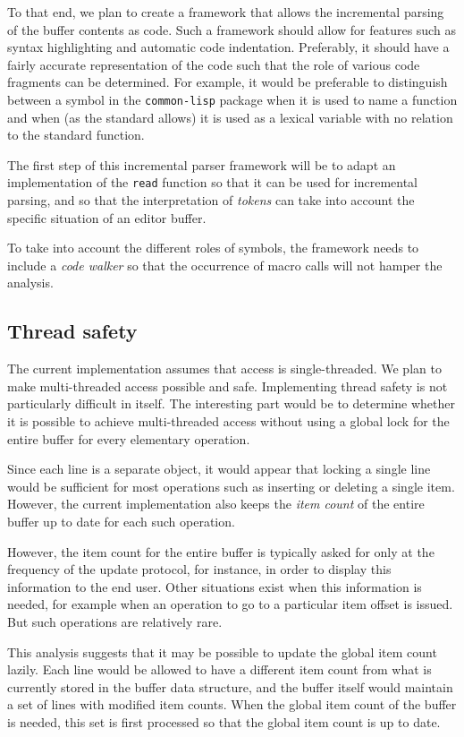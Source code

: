 To that end, we plan to create a framework that allows the incremental
parsing of the buffer contents as \commonlisp{} code.  Such a
framework should allow for features such as syntax highlighting and
automatic code indentation.  Preferably, it should have a fairly
accurate representation of the code such that the role of various code
fragments can be determined.  For example, it would be preferable to
distinguish between a symbol in the \texttt{common-lisp} package when
it is used to name a \commonlisp{} function and when (as the
\commonlisp{} standard allows) it is used as a lexical variable with
no relation to the standard function.

The first step of this incremental parser framework will be to adapt
an implementation of the \commonlisp{} \texttt{read} function so that
it can be used for incremental parsing, and so that the interpretation
of \emph{tokens} can take into account the specific situation of an
editor buffer.

To take into account the different roles of symbols, the framework
needs to include a \emph{code walker} so that the occurrence of macro
calls will not hamper the analysis.

\subsection{Thread safety}

The current implementation assumes that access is single-threaded.  We
plan to make multi-threaded access possible and safe.  Implementing
thread safety is not particularly difficult in itself.  The
interesting part would be to determine whether it is possible to
achieve multi-threaded access without using a global lock for the
entire buffer for every elementary operation.

Since each line is a separate object, it would appear that locking a
single line would be sufficient for most operations such as inserting
or deleting a single item.  However, the current implementation also
keeps the \emph{item count} of the entire buffer up to date for each
such operation.

However, the item count for the entire buffer is typically asked for
only at the frequency of the update protocol, for instance, in order
to display this information to the end user.  Other situations exist
when this information is needed, for example when an operation to go
to a particular item offset is issued.  But such operations are
relatively rare.

This analysis suggests that it may be possible to update the global
item count lazily.  Each line would be allowed to have a different
item count from what is currently stored in the buffer data structure,
and the buffer itself would maintain a set of lines with modified item
counts.  When the global item count of the buffer is needed, this set
is first processed so that the global item count is up to date.
